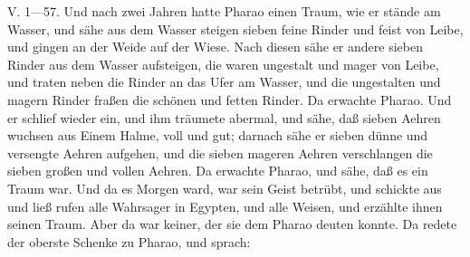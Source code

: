 \begin{schriftzitat}
V. 1—57. Und nach zwei Jahren hatte Pharao einen Traum, wie er stände am Wasser, und sähe aus dem Wasser steigen sieben feine Rinder und feist von Leibe, und gingen an der Weide auf der Wiese. Nach diesen sähe er andere sieben Rinder aus dem Wasser aufsteigen, die waren ungestalt und mager von Leibe, und traten neben die Rinder an das Ufer am Wasser, und die ungestalten und magern Rinder fraßen die schönen und fetten Rinder. Da erwachte Pharao. Und er schlief wieder ein, und ihm träumete abermal, und sähe, daß sieben Aehren wuchsen aus Einem Halme, voll und gut; darnach sähe er sieben dünne und versengte Aehren aufgehen, und die sieben mageren Aehren verschlangen die sieben großen und vollen Aehren. Da erwachte Pharao, und sähe, daß es ein Traum war. Und da es Morgen ward, war sein Geist betrübt, und schickte aus und ließ rufen alle Wahrsager in Egypten, und alle Weisen, und erzählte ihnen seinen Traum. Aber da war keiner, der sie dem Pharao deuten konnte. Da redete der oberste Schenke zu Pharao, und sprach:

\end{schriftzitat}
